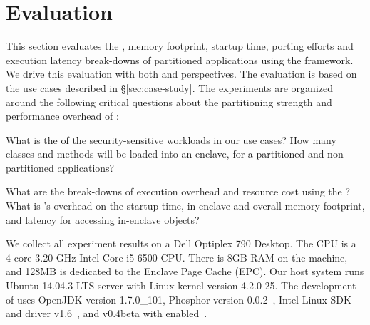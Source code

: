 \section{Evaluation}
\label{sec:eval}


This section evaluates the \tcbsize{}, memory footprint, startup time,
porting efforts and execution latency break-downs of partitioned applications using the \sysname{} framework.
We drive this evaluation 
with both \staticphase{} and \dynamicphase{} perspectives.
The evaluation is based on the use cases described in \S\ref{sec:case-study}.
The experiments are organized around
the following critical questions
about the partitioning strength and performance overhead of \sysname{}:
\begin{compactenum}
\item What is the \tcbsize{} of the security-sensitive workloads in our use cases? How many classes and methods will be loaded into an enclave, for a partitioned and non-partitioned applications?
\item What are the break-downs of execution overhead and resource cost using the \dynamicframework{}? What is \sysname{}'s overhead on the startup time, in-enclave and overall memory footprint, and latency for accessing in-enclave objects?
\end{compactenum}

We collect all experiment results on a
Dell Optiplex 790 Desktop.
The CPU is a 4-core 3.20 GHz Intel Core i5-6500 CPU. %
There is 8GB RAM on the machine, and 128MB is dedicated to the Enclave Page Cache (EPC).
Our host system runs Ubuntu 14.04.3 LTS server with Linux kernel version 4.2.0-25.
The development of \sysname{} uses 
OpenJDK version 1.7.0\_101,
Phosphor version 0.0.2~\cite{phosphor},
Intel \sgx{} Linux SDK~\cite{intel-sgx-linux} and driver v1.6~\cite{intel-sgx-linux-driver},
and \graphene{} v0.4beta with \sgx{} enabled~\cite{graphene-sgx}.


